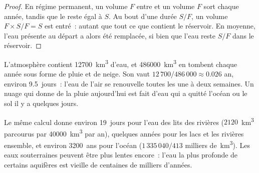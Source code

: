 \begin{proof}
En régime permanent, un volume $F$ entre et un volume $F$ sort chaque année,
tandis que le  reste égal à $S$. Au bout d'une durée $S/F$, un volume $F \times S/F = S$ est
entré~: autant que tout ce que contient le réservoir. En moyenne, l'eau
présente au départ a alors été remplacée, si bien que l'eau reste $S/F$
dans le réservoir.
\end{proof}

\begin{example}\label{ex:g10:freshwater-resources:atmosphere}
L'atmosphère contient \num{12700}~\unit{km^3} d'eau, et
\num{486000}~\unit{km^3} en tombent chaque année sous forme de pluie et de
neige. Son  vaut $12\,700/486\,000 \approx \num{0.026}$
an, environ \num{9.5}~jours~: l'eau de l'air se renouvelle toutes les une à
deux semaines. Un nuage qui donne de la pluie aujourd'hui est fait d'eau qui
a quitté l'océan ou le sol il y a quelques jours.
\end{example}

Le même calcul donne environ \num{19}~jours pour l'eau des lits des rivières
($2120$~\unit{km^3} parcourus par \num{40000}~\unit{km^3} par an), quelques
années pour les lacs et les rivières ensemble, et environ \num{3200}~ans
pour l'océan ($1\,335\,040/413$ milliers de~\unit{km^3}). Les eaux
souterraines peuvent être plus lentes encore~: l'eau la plus profonde de
certains aquifères est vieille de centaines de milliers d'années.

